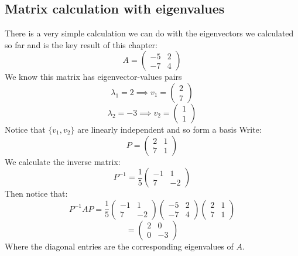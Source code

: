 \documentclass[12pt]{article}
\begin{document}
\subsection*{Matrix calculation with eigenvalues}
There is a very simple calculation we can do with the eigenvectors we calculated so far and is the key result of this chapter:
\[A=\begin{pmatrix}
    -5 & 2 \\
    -7 & 4
\end{pmatrix}\]
We know this matrix has eigenvector-values pairs
\[\lambda_1=2\implies v_1=\begin{pmatrix}
    2 \\ 7
\end{pmatrix}\]
\[\lambda_2=-3\implies v_2=\begin{pmatrix}
    1 \\ 1
\end{pmatrix}\]
Notice that \(\{v_1,v_2\}\) are linearly independent and so form a basis Write:
\[P=\begin{pmatrix}
    2 & 1 \\
    7 & 1
\end{pmatrix}\]
We calculate the inverse matrix:
\[P^{-1}=\frac{1}{5}\begin{pmatrix}
    -1 & 1 \\
    7 & -2
\end{pmatrix}\]
Then notice that:
\[P^{-1}AP=\frac{1}{5}\begin{pmatrix}
    -1 & 1 \\
    7 & -2
\end{pmatrix}\begin{pmatrix}
    -5 & 2 \\
    -7 & 4
\end{pmatrix}\begin{pmatrix}
    2 & 1 \\
    7 & 1
\end{pmatrix}\]
\[=\begin{pmatrix}
    2 & 0 \\
    0 & -3
\end{pmatrix}\]
Where the diagonal entries are the corresponding eigenvalues of \(A\).
\end{document}
